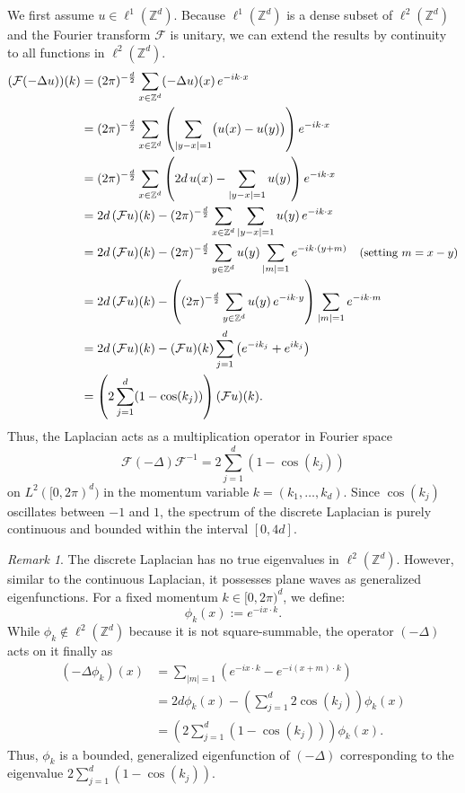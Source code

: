 \documentclass[11pt, a4paper, UKenglish, oneside]{book}
\theoremstyle{plain}
\theoremstyle{remark}
\newtheorem{remark}[theorem]{Remark}
\theoremstyle{definition}
\numberwithin{equation}{section}
\numberwithin{theorem}{section}
\begin{document}
We first assume $u \in \ell^1(\mathbb{Z}^d)$. Because $\ell^1(\mathbb{Z}^d)$ is a dense subset of $\ell^2(\mathbb{Z}^d)$ and the Fourier transform $\mathcal{F}$ is unitary, we can extend the results by continuity to all functions in $\ell^2(\mathbb{Z}^d)$.
\begin{align*}
    (\mathcal{F} (-\Delta u))(k) &= (2\pi)^{-\frac{d}{2}} \sum_{x \in \mathbb{Z}^d} (-\Delta u)(x)\, e^{-i k \cdot x} \\
    &= (2\pi)^{-\frac{d}{2}} \sum_{x \in \mathbb{Z}^d} \left( \sum_{|y-x|=1} \bigl(u(x) - u(y)\bigr) \right) e^{-i k \cdot x} \\
    &= (2\pi)^{-\frac{d}{2}} \sum_{x \in \mathbb{Z}^d} \left( 2d\, u(x) - \sum_{|y-x|=1} u(y) \right) e^{-i k \cdot x} \\
    &= 2d\,(\mathcal{F}u)(k) - (2\pi)^{-\frac{d}{2}} \sum_{x \in \mathbb{Z}^d} \sum_{|y-x|=1} u(y)\, e^{-i k \cdot x} \\
    &= 2d\,(\mathcal{F}u)(k) - (2\pi)^{-\frac{d}{2}} \sum_{y \in \mathbb{Z}^d} u(y) \sum_{|m|=1} e^{-i k \cdot (y+m)} \quad \text{\small (setting $m = x - y$)} \\
    &= 2d\,(\mathcal{F}u)(k) - \left( (2\pi)^{-\frac{d}{2}} \sum_{y \in \mathbb{Z}^d} u(y)\, e^{-i k \cdot y} \right) \sum_{|m|=1} e^{-i k \cdot m} \\
    &= 2d\,(\mathcal{F}u)(k) - (\mathcal{F}u)(k) \sum_{j=1}^d \left( e^{-i k_j} + e^{i k_j} \right) \\
    &= \left( 2 \sum_{j=1}^d ( 1-\cos(k_j)) \right)  (\mathcal{F}u)(k).
\end{align*}
Thus, the Laplacian acts as a  multiplication operator in Fourier space
\begin{equation}\label{eq:1.1.5}
    \mathcal{F} (-\Delta) \mathcal{F}^{-1} =  2 \sum_{j=1}^d (1-\cos(k_j))
\end{equation} 
on $L^2([0,2\pi)^d)$ in the momentum variable $k= (k_1,\dots, k_d)$. Since $\cos(k_j)$ oscillates between $-1$ and $1$, the spectrum of the discrete Laplacian is purely continuous and bounded within the interval $[0,4d]$.

\begin{remark}
    The discrete Laplacian has no true eigenvalues in $\ell^2(\mathbb{Z}^d)$. However, similar to the continuous Laplacian, it possesses plane waves as generalized eigenfunctions. For a fixed momentum $k \in [0,2\pi)^d$, we define:
    \[
    \phi_k(x) := e^{-i x \cdot k}.
    \]
    While $\phi_k \notin \ell^2(\mathbb{Z}^d)$ because it is not square-summable, the operator $(-\Delta)$ acts on it finally as
    \begin{align*}
        (-\Delta \phi_k)(x) &= \sum_{|m|=1} (e^{-ix \cdot k} - e^{-i(x+m)\cdot k}) \\
        &=  2d \phi_k(x) - \left( \sum_{j=1}^d 2\cos(k_j) \right) \phi_k(x) \\
        &= \left( 2 \sum_{j=1}^d (1-\cos(k_j)) \right) \phi_k(x).
    \end{align*}
    Thus, $\phi_k$ is a bounded, generalized eigenfunction of $(-\Delta)$ corresponding to the eigenvalue $2\sum_{j=1}^d (1-\cos(k_j))$. 
\end{remark}
\end{document}

